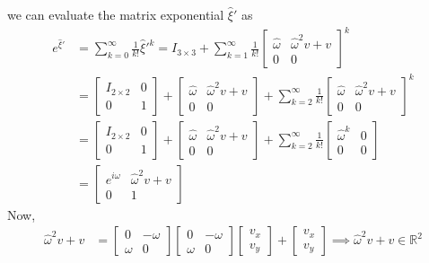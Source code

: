 we can evaluate the matrix exponential \( \hat \xi' \) as
\begin{align*}
    e^{\hat \xi'}
     & =
    \sum_{k=0}^{\infty} \frac{1}{k!} \hat \xi'^k
    =
    I_{3\times 3} + \sum_{k=1}^{\infty} \frac{1}{k!}
    \begin{bmatrix}
        \hat \omega & \hat \omega^2 v + v \\
        0           & 0
    \end{bmatrix}
    ^k
    \\ & =
    \begin{bmatrix}
        I_{2\times 2} & 0 \\
        0             & 1
    \end{bmatrix}
    +
    \begin{bmatrix}
        \hat \omega & \hat \omega^2 v + v \\
        0           & 0
    \end{bmatrix}
    +
    \sum_{k=2}^{\infty} \frac{1}{k!}
    \begin{bmatrix}
        \hat \omega & \hat \omega^2 v + v \\
        0           & 0
    \end{bmatrix}
    ^k
    \\ & =
    \begin{bmatrix}
        I_{2\times 2} & 0 \\
        0             & 1
    \end{bmatrix}
    +
    \begin{bmatrix}
        \hat \omega & \hat \omega^2 v + v \\
        0           & 0
    \end{bmatrix}
    +
    \sum_{k=2}^{\infty} \frac{1}{k!}
    \begin{bmatrix}
        \hat \omega ^k & 0 \\
        0              & 0
    \end{bmatrix}
    \\ & =
    \begin{bmatrix}
        e^{i \omega} & \hat \omega^2 v + v \\
        0            & 1
    \end{bmatrix}
\end{align*}
Now,
\begin{align*}
    \hat \omega^2 v + v
     & =
    \begin{bmatrix}
        0      & -\omega \\
        \omega & 0
    \end{bmatrix}
    \begin{bmatrix}
        0      & -\omega \\
        \omega & 0
    \end{bmatrix}
    \begin{bmatrix}
        v_x \\
        v_y
    \end{bmatrix}
    +
    \begin{bmatrix}
        v_x \\
        v_y
    \end{bmatrix}
    \implies
    \hat \omega^2 v + v \in \mathbb{R}^2
\end{align*}
